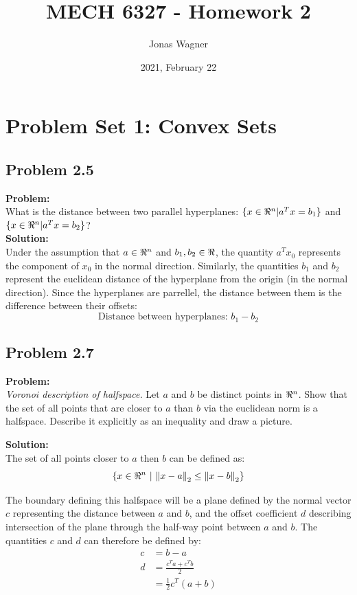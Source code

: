 \documentclass[letter]{article}
\title{MECH 6327 - Homework 2}
\author{Jonas Wagner}
\date{2021, February 22}
\begin{document}
\maketitle


\section{Problem Set 1: Convex Sets}

\subsection{Problem 2.5}
\textbf{Problem:}\\
What is the distance between two parallel hyperplanes: $\{x \in \real^n | a^T x = b_1\}$ and $\{x \in \real^n | a^T x = b_2\}$?\\

\noindent
\textbf{Solution:}\\
Under the assumption that $a\in \real^n$ and $b_1,b_2 \in \real$, the quantity $a^T x_0$ represents the component of $x_0$ in the normal direction. Similarly, the quantities $b_1$ and $b_2$ represent the euclidean distance of the hyperplane from the origin (in the normal direction). Since the hyperplanes are parrellel, the distance between them is the difference between their offsets:
\begin{equation}
	\text{Distance between hyperplanes: } b_1 - b_2
\end{equation}


\subsection{Problem 2.7}
\textbf{Problem:}\\
\textit{Voronoi description of halfspace.} Let $a$ and $b$ be distinct points in $\real^n$. Show that the set of all points that are closer to $a$ than $b$ via the euclidean norm is a halfspace. Describe it explicitly as an inequality and draw a picture.

\noindent
\textbf{Solution:}\\
The set of all points closer to $a$ then $b$ can be defined as:
\begin{equation}
	\{x \in \real^n \ | \ \norm{x-a}_2 \leq \norm{x-b}_2\}
\end{equation}

The boundary defining this halfspace will be a plane defined by the normal vector $c$ representing the distance between $a$ and $b$, and the offset coefficient $d$ describing intersection of the plane through the half-way point between $a$ and $b$. The quantities $c$ and $d$ can therefore be defined by:
\begin{equation}
	\begin{aligned}
		c &= b - a\\
		d &= \frac{c^T a + c^T b}{2}\\
		  &= \frac{1}{2} c^T (a+b)
	\end{aligned}
\end{equation}
\end{document}
